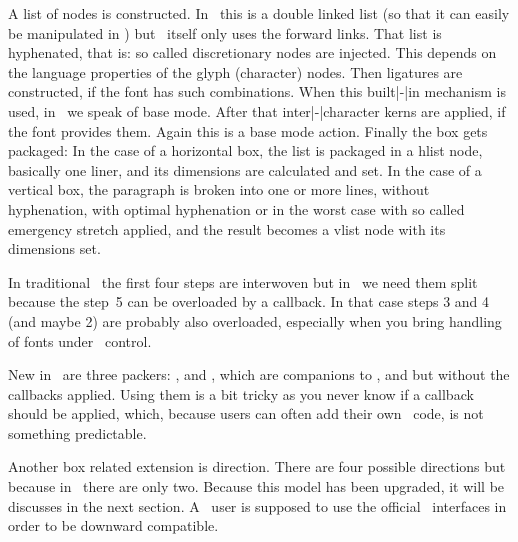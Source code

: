 \startitemize[n]
    \startitem
        A list of nodes is constructed. In \LUATEX\ this is a double linked
        list (so that it can easily be manipulated in \LUA) but \TEX\ itself
        only uses the forward links.
    \stopitem
    \startitem
        That list is hyphenated, that is: so called discretionary nodes are
        injected. This depends on the language properties of the glyph
        (character) nodes.
    \stopitem
    \startitem
        Then ligatures are constructed, if the font has such combinations. When
        this built|-|in mechanism is used, in \CONTEXT\ we speak of base mode.
    \stopitem
    \startitem
        After that inter|-|character kerns are applied, if the font provides
        them. Again this is a base mode action.
    \stopitem
    \startitem
        Finally the box gets packaged:
        \startitemize
            \startitem
                In the case of a horizontal box, the list is packaged in a
                hlist node, basically one liner, and its dimensions are calculated
                and set.
            \stopitem
            \startitem
                In the case of a vertical box, the paragraph is broken into one
                or more lines, without hyphenation, with optimal hyphenation or
                in the worst case with so called emergency stretch applied, and
                the result becomes a vlist node with its dimensions set.
            \stopitem
        \stopitemize
    \stopitem
\stopitemize

In traditional \TEX\ the first four steps are interwoven but in \LUATEX\ we need
them split because the step~5 can be overloaded by a callback. In that case steps
3 and 4 (and maybe 2) are probably also overloaded, especially when you bring
handling of fonts under \LUA\ control.

New in \LUATEX\ are three packers: \type {\hpack}, \type {\vpack} and \type
{\tpack}, which are companions to \type {\hbox}, \type {\vbox} and \type {\vtop}
but without the callbacks applied. Using them is a bit tricky as you never know
if a callback should be applied, which, because users can often add their own
\LUA\ code, is not something predictable.

Another box related extension is direction. There are four possible directions
but because in \LUAMETATEX\ there are only two. Because this model has been upgraded,
it will be discusses in the next section. A \CONTEXT\ user is supposed to use the
official \CONTEXT\ interfaces in order to be downward compatible.

